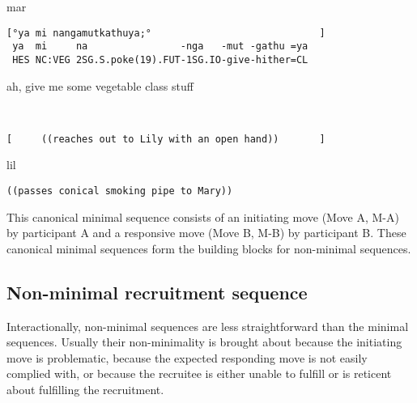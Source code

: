 \documentclass[output=paper,nonflat,colorlinks,citecolor=brown]{langsci/langscibook}
\begin{document}
\vspace{-1mm}
%
\begin{mdframednoverticalspace}[style=firstfoc]
\begin{transbox}{1}{mar}
\begin{verbatim}
[°ya mi nangamutkathuya;°                             ]
 ya  mi     na                -nga   -mut -gathu =ya
 HES NC:VEG 2SG.S.poke(19).FUT-1SG.IO-give-hither=CL
\end{verbatim}
\hspace{0.07cm} ah, give me some vegetable class stuff
\end{transbox}
\end{mdframednoverticalspace}
%
\begin{mdframednoverticalspace}[style=firstfoc]
\begin{transbox}{2}{~}
\begin{verbatim}
[     ((reaches out to Lily with an open hand))       ]
\end{verbatim}
\end{transbox}
\end{mdframednoverticalspace}
%
\vspace{-2mm}
%
\begin{mdframednoverticalspace}[style=secondfoc]
\begin{transbox}{4}{lil}
\begin{verbatim}
((passes conical smoking pipe to Mary))
\end{verbatim}
\end{transbox}
\end{mdframednoverticalspace}

This canonical minimal sequence consists of an initiating move (Move A, M-A) by participant A and a responsive move (Move B, M-B) by participant B. These canonical minimal sequences form the building blocks for non-minimal sequences.

\subsection{Non-minimal recruitment sequence}\label{sec:blythe:2.2}

Interactionally, non-minimal sequences are less straightforward than the minimal sequences. Usually their non-minimality is brought about because the initiating move is problematic, because the expected responding move is not easily complied with, or because the recruitee is either unable to fulfill or is reticent about fulfilling the recruitment.
\end{document}
